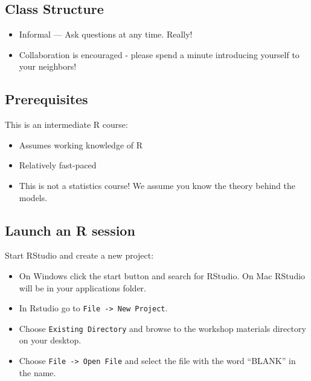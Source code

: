 \documentclass[
]{book}
\providecommand{\tightlist}{%
  \setlength{\itemsep}{0pt}\setlength{\parskip}{0pt}}
\begin{document}
\hypertarget{class-structure-1}{%
\subsection{Class Structure}\label{class-structure-1}}

\begin{itemize}
\tightlist
\item
  Informal --- Ask questions at any time. Really!
\item
  Collaboration is encouraged - please spend a minute introducing yourself to your neighbors!
\end{itemize}

\hypertarget{prerequisites-1}{%
\subsection{Prerequisites}\label{prerequisites-1}}

This is an intermediate R course:

\begin{itemize}
\tightlist
\item
  Assumes working knowledge of R
\item
  Relatively fast-paced
\item
  This is not a statistics course! We assume you know the theory behind the models.
\end{itemize}

\hypertarget{launch-an-r-session}{%
\subsection{Launch an R session}\label{launch-an-r-session}}

Start RStudio and create a new project:

\begin{itemize}
\tightlist
\item
  On Windows click the start button and search for RStudio. On Mac
  RStudio will be in your applications folder.
\item
  In Rstudio go to \texttt{File\ -\textgreater{}\ New\ Project}.
\item
  Choose \texttt{Existing\ Directory} and browse to the workshop materials directory on your desktop.
\item
  Choose \texttt{File\ -\textgreater{}\ Open\ File} and select the file with the word ``BLANK'' in the name.
\end{itemize}
\end{document}
